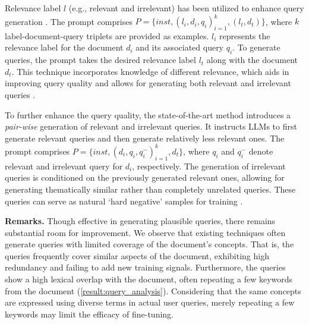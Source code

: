 Relevance label $l$ (e.g., relevant and irrelevant) has been utilized to enhance query generation \cite{label_condition_qgen, saad2023udapdr, inpars}.
The prompt comprises $P = \{inst, (l_i, d_i, q_i)^k_{i=1}, (l_t, d_t)\}$, where $k$ label-document-query triplets are provided as examples.
$l_i$ represents the relevance label for the document $d_i$ and its associated query $q_i$.
To generate queries, the prompt takes the desired relevance label $l_t$ along with the document $d_t$.
This technique incorporates knowledge of different relevance, which aids in improving query quality and allows for generating both relevant and irrelevant queries \cite{label_condition_qgen}.

To further enhance the query quality, the state-of-the-art method \cite{pairwise_qgen} introduces a \textit{pair-wise} generation of relevant and irrelevant queries.
It instructs LLMs to first generate relevant queries and then generate relatively less relevant ones. 
The prompt comprises $P = \{inst, (d_i, q_i, q^-_i)^k_{i=1}, d_t\}$, where $q_i$ and $q^-_i$ denote relevant and irrelevant query for $d_i$, respectively.
The generation of irrelevant queries is conditioned on the previously generated relevant ones, allowing for generating thematically similar rather than completely unrelated queries.
These queries can serve as natural `hard negative' samples for training \cite{pairwise_qgen}.





\vspace{0.03in}
\textbf{Remarks.}
Though effective in generating plausible queries, there remains substantial room for improvement.
We observe that existing techniques often generate queries with limited coverage of the document's concepts.
That is, the queries frequently cover similar aspects of the document, exhibiting high redundancy and failing to add new training signals.
Furthermore, the queries show a high lexical overlap with the document, often repeating a few keywords from the document (\cref{result:query_analysis}).
Considering that the same concepts are expressed using diverse terms in actual user queries, merely repeating a few keywords may limit the efficacy of fine-tuning.

